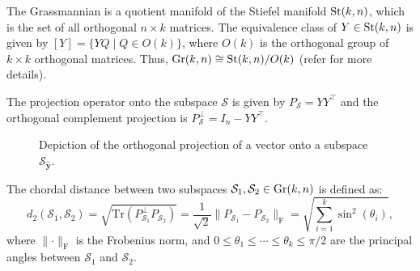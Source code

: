 The Grassmannian is a quotient manifold of the Stiefel manifold $\text{St}(k,n)$, which is the set of all orthogonal $n \times k$ matrices. The equivalence class of $Y \in \text{St}(k,n)$ is given by $[Y] = \{ Y Q \mid Q \in O(k) \}$, where $O(k)$ is the orthogonal group of $k \times k$ orthogonal matrices. Thus, $\text{Gr}(k,n) \cong \text{St}(k,n) / O(k)$ (refer \cite{boumal2023} for more details).

The projection operator onto the subspace $\mathcal{S}$ is given by $P_{\mathcal{S}} = Y Y^\top$ and the orthogonal complement projection is $P_{\mathcal{S}}^{\perp} = I_n - Y Y^\top$.

\begin{figure}[h]
    \centering
{}
\caption{Depiction of the orthogonal projection of a vector onto a subspace $\mathcal{S}_{\hat{\mathbf{y}}}$.}
\end{figure}

\begin{definition}
    The chordal distance between two subspaces $\mathcal{S}_1, \mathcal{S}_2 \in \text{Gr}(k,n)$ is defined as:
    \[
        d_{2}(\mathcal{S}_1, \mathcal{S}_2) = \sqrt{\mathrm{Tr}\left(P_{\mathcal{S}_1}^\perp P_{\mathcal{S}_2}\right)} = \frac{1}{\sqrt{2}}\lVert P_{\mathcal{S}_1} - P_{\mathcal{S}_2} \rVert_{\mathrm{F}} = \sqrt{\sum_{i=1}^{k} \sin^2(\theta_i)},
    \]
    where $\lVert \cdot \rVert_{\mathrm{F}}$ is the Frobenius norm, and $0 \leq \theta_1 \leq \cdots \leq \theta_k \leq \pi/2$ are the principal angles between $\mathcal{S}_1$ and $\mathcal{S}_2$.
    
\end{definition}

